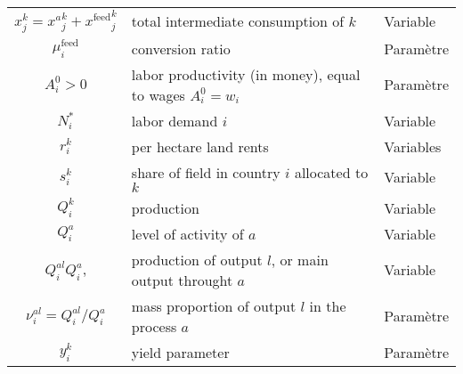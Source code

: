 \begin{table}[h!]
\begin{tabular}{c|l|l}
        ${x}_j^k = {x^a}_j^k + {x^\text{feed}}_j^k$ & total intermediate consumption of $k$                              & Variable                          \\

        ${\mu_i^\text{feed}}$                       & conversion ratio                                                   & Paramètre                         \\

        $A_i^0 > 0$                                 & labor productivity (in money), equal to wages $A_i^0 = w_i$        & Paramètre                         \\

        $N_i^*$                                     & labor demand $i$                                                   & Variable                          \\

        $r_i^k$                                     & per hectare land rents                                             & Variables                         \\

        $s_i^k$                                     & share of field in country $i$ allocated to $k$                     & Variable                          \\

        $Q_i^k$                                     & production                                                         & Variable                          \\

        $Q_i^a$                                     & level of activity of $a$                                           & Variable                          \\

        $Q_i^{al} Q_i^{a}$,                         & production of output $l$, or main output throught $a$              & Variable                          \\

        $\nu_i^{al} = Q_i^{al} / Q_i^a$             & mass proportion of output $l$ in the process $a$                   & Paramètre                         \\

        $y_i^k$                                     & yield parameter                                                    & Paramètre                         \\


\end{tabular}
\end{table}
